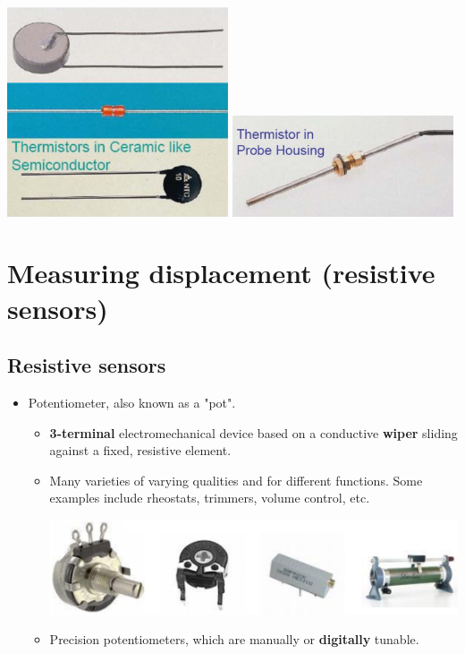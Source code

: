 \documentclass[11pt]{article}
\begin{document}
\begin{center}
\includegraphics[width=0.49\textwidth]{./images/thermistors-in-ceramic-like-semiconductor.png}
\includegraphics[width=0.49\textwidth]{./images/thermistor-in-probe-housing.png}
\end{center}

 \newpage
\section{Measuring displacement (resistive sensors)}
\label{sec:orgb694a4f}

\subsection{Resistive sensors}
\label{sec:org403229c}
\begin{itemize}
\item Potentiometer, also known as a "pot".
\begin{itemize}
\item \textbf{3-terminal} electromechanical device based on a conductive \textbf{wiper} sliding against a fixed, resistive element.
\item Many varieties of varying qualities and for different functions. Some examples include rheostats, trimmers, volume control, etc.
\begin{center}
\includegraphics[width=.9\linewidth]{./images/types-of-potentiometers.png}
\end{center}
\item Precision potentiometers, which are manually or \textbf{digitally} tunable.
\end{itemize}
\end{itemize}
\end{document}

